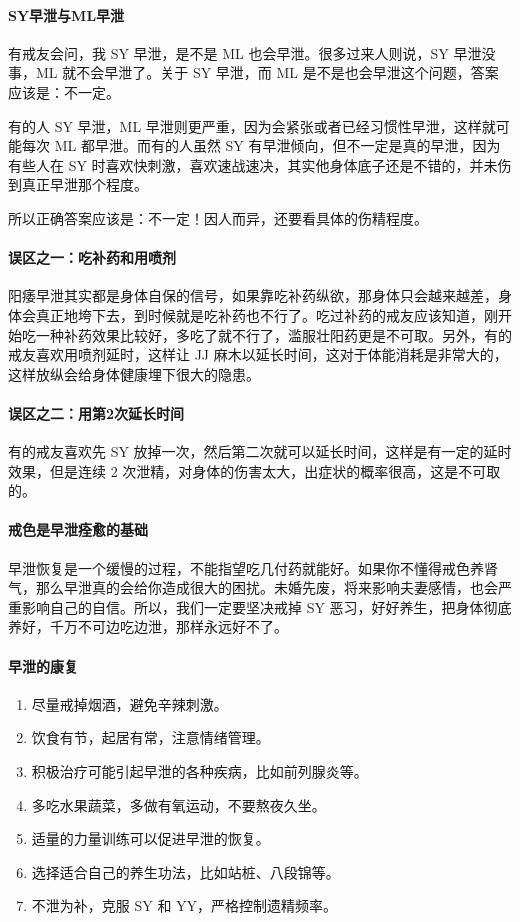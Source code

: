 \documentclass{ctexart}
\begin{document}
\paragraph{SY早泄与ML早泄}

有戒友会问，我 SY 早泄，是不是 ML 也会早泄。很多过来人则说，SY 早泄没事，ML 就不会早泄了。关于 SY 早泄，而 ML 是不是也会早泄这个问题，答案应该是：不一定。

有的人 SY 早泄，ML 早泄则更严重，因为会紧张或者已经习惯性早泄，这样就可能每次 ML 都早泄。而有的人虽然 SY 有早泄倾向，但不一定是真的早泄，因为有些人在 SY 时喜欢快刺激，喜欢速战速决，其实他身体底子还是不错的，并未伤到真正早泄那个程度。

所以正确答案应该是：不一定！因人而异，还要看具体的伤精程度。

\paragraph{误区之一：吃补药和用喷剂}

阳痿早泄其实都是身体自保的信号，如果靠吃补药纵欲，那身体只会越来越差，身体会真正地垮下去，到时候就是吃补药也不行了。吃过补药的戒友应该知道，刚开始吃一种补药效果比较好，多吃了就不行了，滥服壮阳药更是不可取。另外，有的戒友喜欢用喷剂延时，这样让 JJ 麻木以延长时间，这对于体能消耗是非常大的，这样放纵会给身体健康埋下很大的隐患。

\paragraph{误区之二：用第2次延长时间}

有的戒友喜欢先 SY 放掉一次，然后第二次就可以延长时间，这样是有一定的延时效果，但是连续 2 次泄精，对身体的伤害太大，出症状的概率很高，这是不可取的。

\paragraph{戒色是早泄痊愈的基础}

早泄恢复是一个缓慢的过程，不能指望吃几付药就能好。如果你不懂得戒色养肾气，那么早泄真的会给你造成很大的困扰。未婚先废，将来影响夫妻感情，也会严重影响自己的自信。所以，我们一定要坚决戒掉 SY 恶习，好好养生，把身体彻底养好，千万不可边吃边泄，那样永远好不了。

\paragraph{早泄的康复}

\begin{enumerate}
    \item 尽量戒掉烟酒，避免辛辣刺激。
    \item 饮食有节，起居有常，注意情绪管理。
    \item 积极治疗可能引起早泄的各种疾病，比如前列腺炎等。
    \item 多吃水果蔬菜，多做有氧运动，不要熬夜久坐。
    \item 适量的力量训练可以促进早泄的恢复。
    \item 选择适合自己的养生功法，比如站桩、八段锦等。
    \item 不泄为补，克服 SY 和 YY，严格控制遗精频率。
\end{enumerate}
\end{document}
